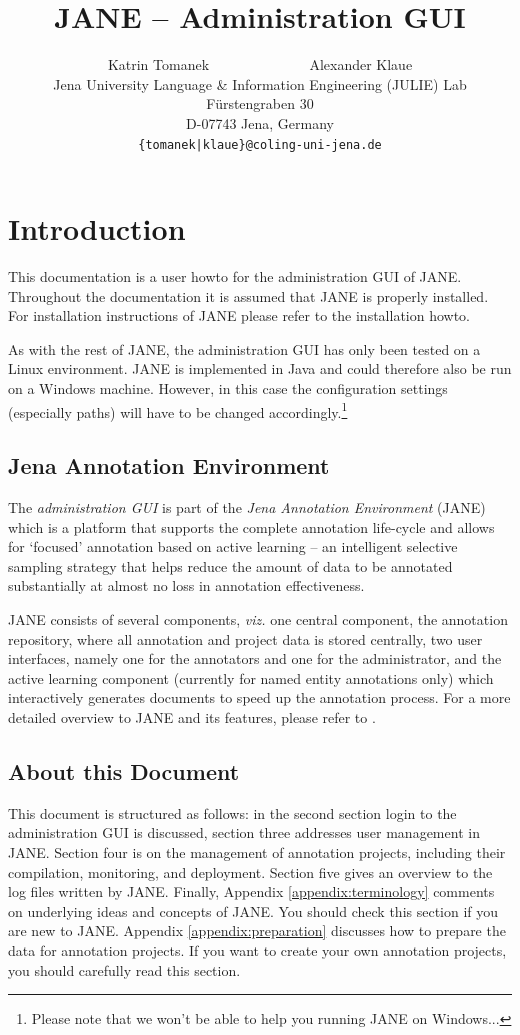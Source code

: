 \documentclass[DIV12,english,11pt,halfparskip]{scrartcl}
\title{JANE -- Administration GUI}
\author{\normalsize Katrin Tomanek ~~~~~~~~~~~~~ Alexander Klaue\\
  \normalsize  Jena University Language \& Information Engineering (JULIE) Lab\\
  \normalsize F\"urstengraben 30 \\
  \normalsize D-07743 Jena, Germany\\
  {\normalsize \tt \{tomanek|klaue\}@coling-uni-jena.de} } \date{}
\begin{document}
\maketitle
\newpage
\tableofcontents
\newpage


\section{Introduction}


This documentation is a user howto for the administration GUI of JANE.
Throughout the documentation it is assumed that JANE is properly
installed.  For installation instructions of JANE please refer to the
installation howto.

As with the rest of JANE, the administration GUI has only been tested
on a Linux environment. JANE is implemented in Java and could therefore
also be run on a Windows machine. However, in this case the
configuration settings (especially paths) will have to be changed
accordingly.\footnote{Please note that we won't be able to help you
  running JANE on Windows...}


\subsection{Jena Annotation Environment}

The \emph{administration GUI} is part of the \emph{Jena Annotation
  Environment} (JANE) which is a platform that supports the complete
annotation life-cycle and allows for `focused' annotation based on
active learning -- an intelligent selective sampling strategy that
helps reduce the amount of data to be annotated substantially at
almost no loss in annotation effectiveness.

JANE consists of several components, \textit{viz.} one central
component, the annotation repository, where all annotation and project
data is stored centrally, two user interfaces, namely one for the
annotators and one for the administrator, and the active learning
component (currently for named entity annotations only) which
interactively generates documents to speed up the annotation
process. For a more detailed overview to JANE and its features, please
refer to \cite{Tomanek2007law}.


\subsection{About this Document}

This document is structured as follows: in the second section login to
the administration GUI is discussed, section three addresses user
management in JANE. Section four is on the management of annotation
projects, including their compilation, monitoring, and deployment.
Section five gives an overview to the log files written by JANE.
Finally, Appendix \ref{appendix:terminology} comments on underlying
ideas and concepts of JANE. You should check this section if you are
new to JANE.  Appendix \ref{appendix:preparation} discusses how to
prepare the data for annotation projects. If you want to create your
own annotation projects, you should carefully read this section.
\end{document}
